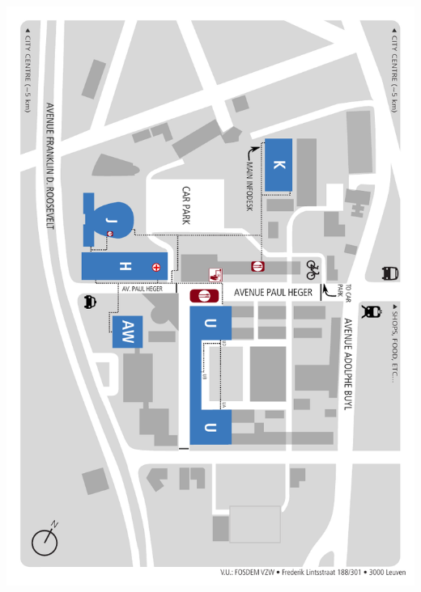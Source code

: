 \documentclass[a4paper,10pt]{article}
\begin{document}


\label{backcover}%
\includegraphics[width=\textwidth]{artwork/campusmap}
\end{document}
